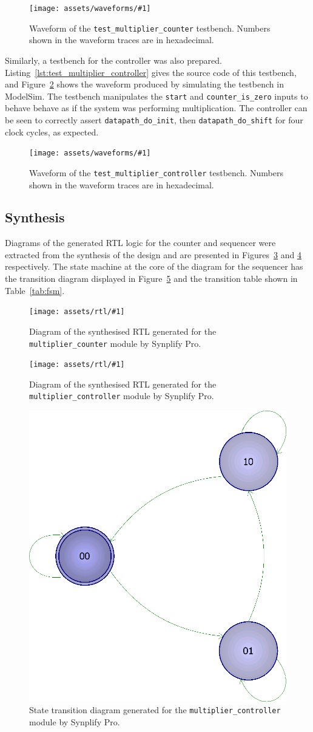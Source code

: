 \documentclass[a4paper]{article}
\newcommand{\waveformfigure}[2]{
  \begin{figure}[tp]
    \centering\texttt{[image: assets/waveforms/\#1]}
    \caption{#2}
    \label{fig:wave:#1}
  \end{figure}
}
\newcommand{\rtlfigure}[2]{
  \begin{figure}[tp]
    \centering\texttt{[image: assets/rtl/\#1]}
    \caption{#2}
    \label{fig:rtl:#1}
  \end{figure}
}
\begin{document}
\waveformfigure{test_multiplier_counter}{Waveform of the \texttt{test\_multiplier\_counter} testbench. Numbers shown in the waveform traces are in hexadecimal.}

Similarly, a testbench for the controller was also prepared. Listing~\ref{lst:test_multiplier_controller} gives the source code of this testbench, and Figure~\ref{fig:wave:test_multiplier_controller} shows the waveform produced by simulating the testbench in ModelSim. The testbench manipulates the \texttt{start} and \texttt{counter\_is\_zero} inputs to behave behave as if the system was performing multiplication. The controller can be seen to correctly assert \texttt{datapath\_do\_init}, then \texttt{datapath\_do\_shift} for four clock cycles, as expected.

\waveformfigure{test_multiplier_controller}{Waveform of the \texttt{test\_multiplier\_controller} testbench. Numbers shown in the waveform traces are in hexadecimal.}

\subsection{Synthesis}
\label{sec:seq:synth}

Diagrams of the generated RTL logic for the counter and sequencer were extracted from the synthesis of the design and are presented in Figures~\ref{fig:rtl:multiplier_counter} and \ref{fig:rtl:multiplier_controller} respectively. The state machine at the core of the diagram for the sequencer has the transition diagram displayed in Figure~\ref{fig:fsm} and the transition table shown in Table~\ref{tab:fsm}.

\rtlfigure{multiplier_counter}{Diagram of the synthesised RTL generated for the \texttt{multiplier\_counter} module by Synplify Pro.}

\rtlfigure{multiplier_controller}{Diagram of the synthesised RTL generated for the \texttt{multiplier\_controller} module by Synplify Pro.}

\begin{figure}[tp]
  \centering\includegraphics[width=.3\textwidth]{assets/rtl/fsm}
  \caption{State transition diagram generated for the \texttt{multiplier\_controller} module by Synplify Pro.}
  \label{fig:fsm}
\end{figure}
\end{document}
